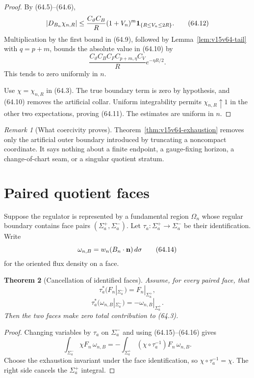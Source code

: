 \documentclass[11pt]{article}
\newtheorem{theorem}{Theorem}[section]
\theoremstyle{remark}
\newtheorem{remark}[theorem]{Remark}
\begin{document}
\begin{proof}
By (64.5)--(64.6),
\[
 |D_{B_n}\chi_{n,R}|
 \leq
 \frac{C_\vartheta C_B}{R}(1+V_n)^m
 {\bf1}_{\{R\leq V_n\leq2R\}}.                        \tag{64.12}
\]
Multiplication by the first bound in (64.9), followed by
Lemma~\ref{lem:v15v64-tail} with \(q=p+m\), bounds the
absolute value in (64.10) by
\[
 \frac{C_\vartheta C_BC_FC_{p+m,\eta}C_V}{R}
 e^{-\eta R/2}.                                       \tag{64.13}
\]
This tends to zero uniformly in \(n\).

Use \(\chi=\chi_{n,R}\) in (64.3).  The true boundary term is zero
by hypothesis, and (64.10) removes the artificial collar.
Uniform integrability permits \(\chi_{n,R}\uparrow1\) in the other
two expectations, proving (64.11).  The estimates are uniform in
\(n\).
\end{proof}

\begin{remark}[What coercivity proves]
\label{rem:v15v64-coercivity}
Theorem~\ref{thm:v15v64-exhaustion} removes only the artificial
outer boundary introduced by truncating a noncompact coordinate.
It says nothing about a finite endpoint, a gauge-fixing horizon, a
change-of-chart seam, or a singular quotient stratum.
\end{remark}

\section{Paired quotient faces}

Suppose the regulator is represented by a fundamental region
\(\Omega_n\) whose regular boundary contains face pairs
\((\Sigma_a^+,\Sigma_a^-)\).  Let
\(\tau_a:\Sigma_a^+\to\Sigma_a^-\) be their identification.
Write
\[
 \omega_{n,B}=w_n(B_n\mathbin{\cdot}{\bf n})\,d\sigma \tag{64.14}
\]
for the oriented flux density on a face.

\begin{theorem}[Cancellation of identified faces]
\label{thm:v15v64-face-pair}
Assume, for every paired face, that
\[
 \tau_a^*(F_n|_{\Sigma_a^-})=F_n|_{\Sigma_a^+},        \tag{64.15}
\]
\[
 \tau_a^*(\omega_{n,B}|_{\Sigma_a^-})
 =
 -\omega_{n,B}|_{\Sigma_a^+}.                         \tag{64.16}
\]
Then the two faces make zero total contribution to (64.3).
\end{theorem}

\begin{proof}
Changing variables by \(\tau_a\) on \(\Sigma_a^-\) and using
(64.15)--(64.16) gives
\[
 \int_{\Sigma_a^-}\chi F_n\,\omega_{n,B}
 =
 -\int_{\Sigma_a^+}(\chi\circ\tau_a^{-1})F_n\,
 \omega_{n,B}.                                        \tag{64.17}
\]
Choose the exhaustion invariant under the face identification, so
\(\chi\circ\tau_a^{-1}=\chi\).  The right side cancels the
\(\Sigma_a^+\) integral.
\end{proof}
\end{document}

